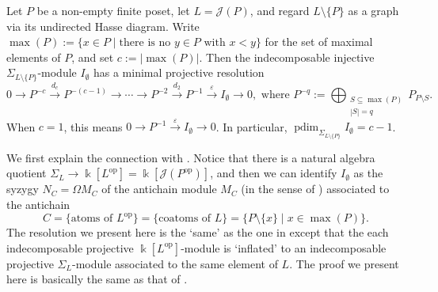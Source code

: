 \documentclass[a4paper,leqno]{amsart}
\begin{document}
\begin{prop}\label{prop:punctured-distributive-resolution}
Let $P$ be a non-empty finite poset, let $L=\mathcal J(P)$, and regard $L\setminus\{P\}$ as a graph via its undirected Hasse diagram.  Write $\max(P):=\{x\in P\mid \text{there is no $y\in P$ with $x<y$}\}$ for the set of maximal elements of $P$, and set $c:=|\max(P)|$.  Then the indecomposable injective $\Sigma_{L\setminus\{P\}}$-module $I_{\emptyset}$ has a minimal projective resolution
\[
0\longrightarrow P^{-c}\xrightarrow{d_c}P^{-(c-1)}
\longrightarrow\cdots\longrightarrow
P^{-2}\xrightarrow{d_2}P^{-1}
\xrightarrow{\varepsilon}I_{\emptyset}
\longrightarrow0, \text{ where }
P^{-q}:=\bigoplus_{\substack{S\subseteq\max(P)\\|S|=q}} P_{P\setminus S}.
\]
When $c=1$, this means $0\to P^{-1}\xrightarrow{\varepsilon}I_{\emptyset}\to0$.  In particular, $\operatorname{pdim}_{\Sigma_{L\setminus\{P\}}}I_{\emptyset}=c-1$.
\end{prop}


We first explain the connection with \cite[Theorem~2.2]{IM22}.  
Notice that there is a natural algebra quotient $\Sigma_L\to \Bbbk[L^{\operatorname{op}}]=\Bbbk[\mathcal{J}(P^{\operatorname{op}})]$, and then we can identify $I_{\emptyset}$ as the syzygy $N_C=\Omega M_C$ of the antichain module $M_C$ (in the sense of \cite{IM22}) associated to the antichain 
\[C=\{\text{atoms of $L^{\operatorname{op}}$}\}=\{\text{coatoms of $L$}\}=\{P\setminus \{x\}\mid x\in\max(P)\}.\]
The resolution we present here is the `same' as  the one in \cite[Theorem~2.2]{IM22} except that the each indecomposable projective $\Bbbk[L^{\operatorname{op}}]$-module is `inflated' to an indecomposable projective $\Sigma_L$-module associated to the same element of $L$.
The proof we present here is basically the same as that of \cite[Theorem~2.2]{IM22}.

\end{document}
